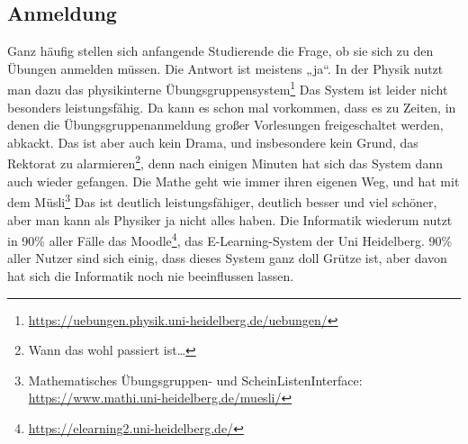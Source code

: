\subsection{Anmeldung}
Ganz häufig stellen sich anfangende Studierende die Frage, ob sie sich zu den Übungen anmelden müssen. Die Antwort ist meistens „ja“. In der Physik nutzt man dazu das physikinterne Übungsgruppensystem\footnote{\url{https://uebungen.physik.uni-heidelberg.de/uebungen/}} Das System ist leider nicht besonders leistungsfähig. Da kann es schon mal vorkommen, dass es zu Zeiten, in denen die Übungsgruppenanmeldung großer Vorlesungen freigeschaltet werden, abkackt. Das ist aber auch kein Drama, und insbesondere kein Grund, das Rektorat zu alarmieren\footnote{Wann das wohl passiert ist…}, denn nach einigen Minuten hat sich das System dann auch wieder gefangen. Die Mathe geht wie immer ihren eigenen Weg, und hat mit dem Müsli\footnote{Mathematisches Übungsgruppen- und ScheinListenInterface:\\ \url{https://www.mathi.uni-heidelberg.de/muesli/}} Das ist deutlich leistungsfähiger, deutlich besser und viel schöner, aber man kann als Physiker ja nicht alles haben. Die Informatik wiederum nutzt in 90\% aller Fälle das Moodle\footnote{\url{https://elearning2.uni-heidelberg.de/}}, das E-Learning-System der Uni Heidelberg. 90\% aller Nutzer sind sich einig, dass dieses System ganz doll Grütze ist, aber davon hat sich die Informatik noch nie beeinflussen lassen.
